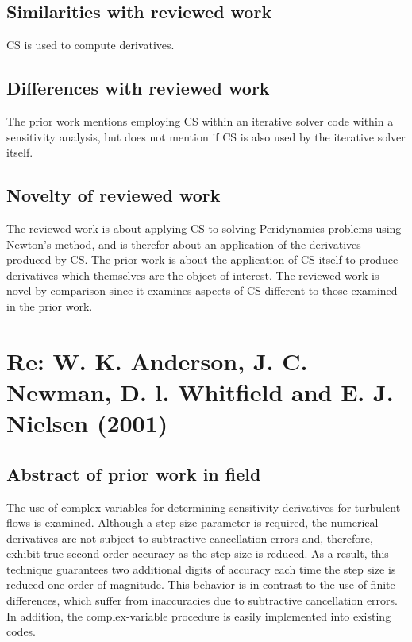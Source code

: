 \documentclass[10pt,letterpaper,draft]{article}
\begin{document}
\subsection{Similarities with reviewed work}

CS is used to compute derivatives.

\subsection{Differences with reviewed work}

The prior work mentions employing CS within an iterative solver code within a sensitivity analysis, but
does not mention if CS is also used by the iterative solver itself. 

\subsection{Novelty of reviewed work}

The reviewed work is about applying CS to solving Peridynamics problems using Newton's method, and is therefor about an
application of the derivatives produced by CS. The prior work is about the application of CS itself to produce derivatives
which themselves are the object of interest. The reviewed work is novel by comparison since it examines aspects of CS
different to those examined in the prior work.

\section{Re: W. K. Anderson, J. C. Newman, D. l. Whitfield and E. J. Nielsen (2001)}
\subsection{Abstract of prior work in field}

The use of complex variables for determining sensitivity derivatives for
turbulent flows is examined. Although a step size parameter is required, the
numerical derivatives are not subject to subtractive cancellation errors and,
therefore, exhibit true second-order accuracy as the step size is reduced. As a
result, this technique guarantees two additional digits of accuracy each time
the step size is reduced one order of magnitude. This behavior is in contrast
to the use of finite differences, which suffer from inaccuracies due to
subtractive cancellation errors. In addition, the complex-variable procedure is
easily implemented into existing codes.
\end{document}
